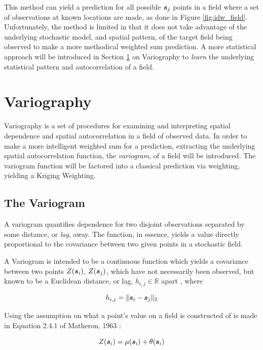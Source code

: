 This method can yield a prediction for all possible ${\it{\boldsymbol{s}}}_j$ points in a field where a set of observations at known locations are made, as done in Figure \ref{fig:idw_field}. Unfortunately, the method is limited in that it does not take advantage of the underlying stochastic model, and spatial pattern, of the target field being observed to make a more methodical weighted sum prediction. A more statistical approach will be introduced in Section \ref{sec:vario} on Variography to \textit{learn} the underlying statistical pattern and autocorrelation of a field.

\section{Variography} \label{sec:vario}
Variography is a set of procedures for examining and interpreting spatial dependence and spatial autocorrelation in a field of observed data. In order to make a more intelligent weighted sum for a prediction, extracting the underlying spatial autocorrelation function, the \textit{variogram}, of a field will be introduced. The variogram function will be factored into a classical prediction via weighting, yielding a Kriging Weighting.

\subsection{The Variogram}
A variogram quantifies dependence for two disjoint observations separated by some distance, or \textit{lag}, away. The function, in essence, yields a value directly proportional to the covariance between two given points in a stochastic field.

A Variogram is intended to be a continuous function which yields a covariance between two points $Z({\it{\boldsymbol{s}}}_{i})$, $Z({\it{\boldsymbol{s}}}_{j})$, which have not necessarily been observed, but known to be a Euclidean distance, or lag, $h_{i,j} \in \mathbb{R}$ apart \cite{deutsch:geostat}, where

\begin{equation}
h_{i,j} = \| {\it{\boldsymbol{s}}}_i - {\it{\boldsymbol{s}}}_j \|_2
\label{eq:hdist}
\end{equation}

Using the assumption on what a point's value on a field is constructed of is made in Equation 2.4.1 of Matheron, 1963 \cite{matheron:geostat}:

\begin{equation}
    Z({\it{\boldsymbol{s}}}_i)=\mu({\it{\boldsymbol{s}}}_i)+\theta({\it{\boldsymbol{s}}}_i)
    \label{eq:matheron:assum}
\end{equation}

